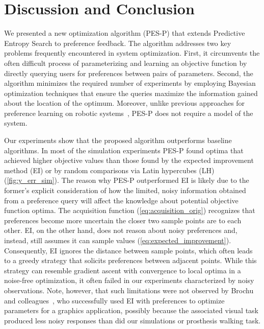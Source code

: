 \section{Discussion and Conclusion}\label{sec:tuning_discussion}
We presented a new optimization algorithm (PES-P) that extends Predictive
Entropy Search to preference feedback. The algorithm addresses two key problems
frequently encountered in system optimization. First, it circumvents the often
difficult process of parameterizing and learning an objective function by
directly querying users for preferences between pairs of parameters. Second, the
algorithm minimizes the required number of experiments by employing Bayesian
optimization techniques that ensure the queries maximize the information gained
about the location of the optimum. Moreover, unlike previous approaches for
preference learning on robotic systems~\citep{wilson2012bayesian,
jain2013learning}, PES-P does not require a model of the system.

Our experiments show that the proposed algorithm outperforms baseline
algorithms. In most of the simulation experiments PES-P found optima that
achieved higher objective values than those found by the expected improvement
method (EI) or by random comparisons via Latin hypercubes (LH)
(\cref{fig:y_err_sim}). The reason why PES-P outperformed EI is likely due to
the former's explicit consideration of how the limited, noisy information
obtained from a preference query will affect the knowledge about potential
objective function optima. The acquisition function (\cref{eq:acquisition_orig})
recognizes that preferences become more uncertain the closer two sample points
are to each other. EI, on the other hand, does not reason about noisy
preferences and, instead, still assumes it can sample values
(\cref{eq:expected_improvement}). Consequently, EI ignores the distance between
sample points, which often leads to a greedy strategy that solicits preferences
between adjacent points. While this strategy can resemble gradient ascent with
convergence to local optima in a noise-free optimization, it often failed in our
experiments characterized by noisy observations. Note, however, that such
limitations were not observed by Brochu and colleagues~\citep{eric2008active},
who successfully used EI with preferences to optimize parameters for a graphics
application, possibly because the associated visual task produced less noisy
responses than did our simulations or prosthesis walking task. 

